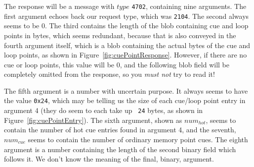 \documentclass[11pt]{article}
\begin{document}
The response will be a message with $type$ {\tt 4702}, containing
nine arguments. The first argument echoes back our request type, which
was {\tt 2104}. The second always seems to be 0. The third contains
the length of the blob containing cue and loop points in bytes, which
seems redundant, because that is also conveyed in the fourth argument
itself, which is a blob containing the actual bytes of the cue and
loop points, as shown in Figure~\ref{fig:cuePointResponse}.
However, if there are no cue or loop points, this value will be 0, and
the following blob field will be completely omitted from the response,
so you \emph{must not} try to read it!

The fifth argument is a number with uncertain purpose. It always seems
to have the value {\tt 0x24}, which may be telling us the size of each
cue/loop point entry in argument 4 (they do seem to each take up {\tt
  24} bytes, as shown in Figure~\ref{fig:cuePointEntry}). The sixth
argument, shown as $num_{hot}$, seems to contain the number of hot cue
entries found in argument 4, and the seventh, $num_{cue}$ seems to
contain the number of ordinary memory point cues. The eighth argument
is a number containing the length of the second binary field which
follows it. We don't know the meaning of the final, binary, argument.
\end{document}
